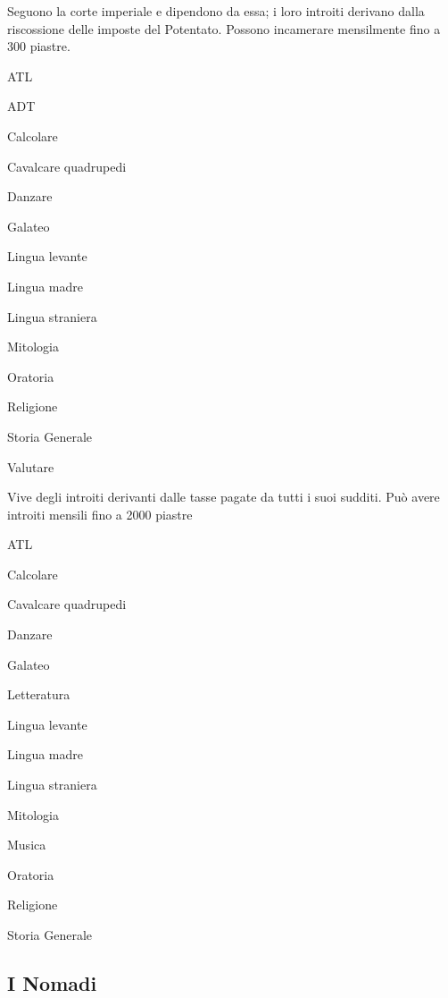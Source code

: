 Seguono la corte imperiale e dipendono da essa; i loro introiti
derivano dalla riscossione delle imposte del Potentato. Possono
incamerare mensilmente fino a 300 piastre.

\begin{abilist}
\item ATL
\item ADT
\item Calcolare
\item Cavalcare quadrupedi
\item Danzare
\item Galateo
\item Lingua levante
\item Lingua madre
\item Lingua straniera
\item Mitologia
\item Oratoria
\item Religione
\item Storia Generale
\item Valutare
\end{abilist}



Vive degli introiti derivanti dalle tasse pagate da tutti i suoi
sudditi. Pu\`o avere introiti mensili fino a 2000 piastre

\begin{abilist}
\item ATL
\item Calcolare
\item Cavalcare quadrupedi
\item Danzare
\item Galateo
\item Letteratura
\item Lingua levante
\item Lingua madre
\item Lingua straniera
\item Mitologia
\item Musica
\item Oratoria
\item Religione
\item Storia Generale
\end{abilist}


\subsection{I Nomadi}

